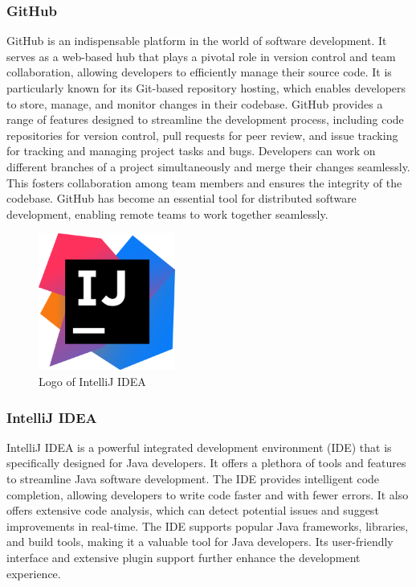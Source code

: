\documentclass[conference]{IEEEtran}
\begin{document}
        \subsubsection{GitHub}
        GitHub is an indispensable platform in the world of software development. It serves as a web-based hub that plays a pivotal role in version control and team collaboration, allowing developers to efficiently manage their source code. It is particularly known for its Git-based repository hosting, which enables developers to store, manage, and monitor changes in their codebase. GitHub provides a range of features designed to streamline the development process, including code repositories for version control, pull requests for peer review, and issue tracking for tracking and managing project tasks and bugs. Developers can work on different branches of a project simultaneously and merge their changes seamlessly. This fosters collaboration among team members and ensures the integrity of the codebase. GitHub has become an essential tool for distributed software development, enabling remote teams to work together seamlessly.\\
        
        \begin{figure}[htbp]
        \centerline{\includegraphics[width = 4.5cm]{Images/logo/intellij.png}}
        \label{fig}
        \caption{Logo of IntelliJ IDEA}
        \end{figure}
        \subsubsection{IntelliJ IDEA}
        IntelliJ IDEA is a powerful integrated development environment (IDE) that is specifically designed for Java developers. It offers a plethora of tools and features to streamline Java software development. The IDE provides intelligent code completion, allowing developers to write code faster and with fewer errors. It also offers extensive code analysis, which can detect potential issues and suggest improvements in real-time. The IDE supports popular Java frameworks, libraries, and build tools, making it a valuable tool for Java developers. Its user-friendly interface and extensive plugin support further enhance the development experience.\\
    
\end{document}
